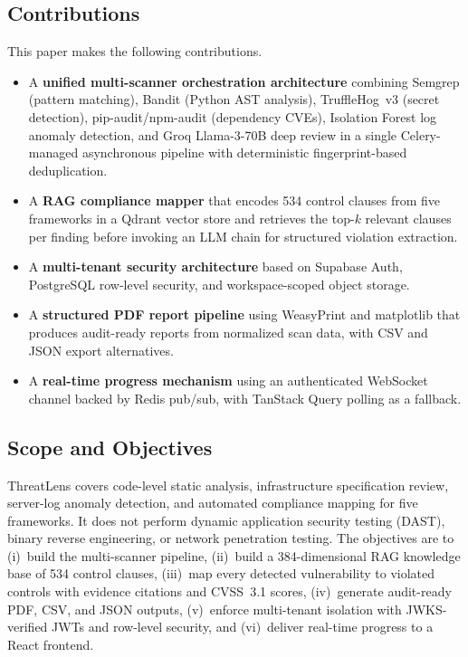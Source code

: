 \documentclass[conference]{IEEEtran}
\begin{document}
\subsection{Contributions}
This paper makes the following contributions.
\begin{itemize}[leftmargin=*,nosep]
  \item A \textbf{unified multi-scanner orchestration architecture} combining
  Semgrep (pattern matching), Bandit (Python AST analysis), TruffleHog~v3 (secret
  detection), pip-audit/npm-audit (dependency CVEs), Isolation Forest log anomaly
  detection, and Groq Llama-3-70B deep review in a single Celery-managed
  asynchronous pipeline with deterministic fingerprint-based deduplication.
  \item A \textbf{RAG compliance mapper} that encodes 534 control clauses from
  five frameworks in a Qdrant vector store and retrieves the top-$k$ relevant
  clauses per finding before invoking an LLM chain for structured violation
  extraction.
  \item A \textbf{multi-tenant security architecture} based on Supabase Auth,
  PostgreSQL row-level security, and workspace-scoped object storage.
  \item A \textbf{structured PDF report pipeline} using WeasyPrint and
  matplotlib that produces audit-ready reports from normalized scan data, with
  CSV and JSON export alternatives.
  \item A \textbf{real-time progress mechanism} using an authenticated WebSocket
  channel backed by Redis pub/sub, with TanStack Query polling as a fallback.
\end{itemize}

\subsection{Scope and Objectives}
ThreatLens covers code-level static analysis, infrastructure specification
review, server-log anomaly detection, and automated compliance mapping for five
frameworks. It does not perform dynamic application security testing (DAST),
binary reverse engineering, or network penetration testing. The objectives are to
(i)~build the multi-scanner pipeline, (ii)~build a 384-dimensional RAG knowledge
base of 534 control clauses, (iii)~map every detected vulnerability to violated
controls with evidence citations and CVSS~3.1 scores, (iv)~generate audit-ready
PDF, CSV, and JSON outputs, (v)~enforce multi-tenant isolation with JWKS-verified
JWTs and row-level security, and (vi)~deliver real-time progress to a React
frontend.
\end{document}
